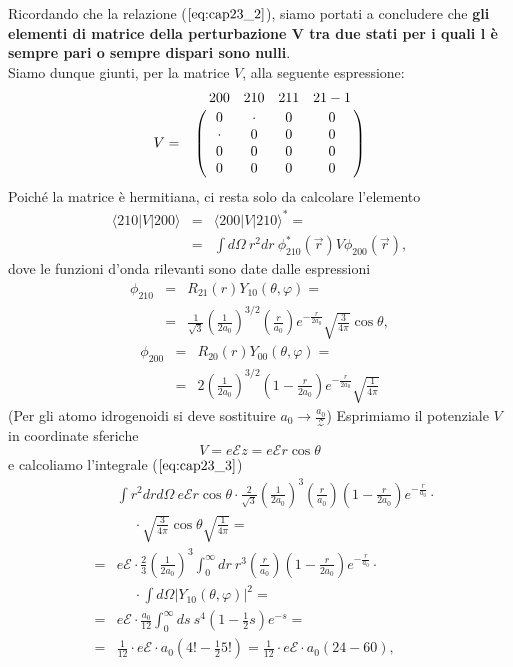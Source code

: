 Ricordando che la relazione ($\ref{eq:cap23_2}$), siamo portati a concludere che \textbf{gli elementi di matrice della perturbazione $\boldsymbol{V}$ tra due stati per i quali $\boldsymbol{l}$ è sempre pari o sempre dispari sono nulli}.\\
Siamo dunque giunti, per la matrice $V$, alla seguente espressione:
\begin{equation}  
V=
\bordermatrix{~&200&210&211&21-1\cr
& 0 & \cdot & 0 & 0 \cr
& \cdot & 0 & 0 & 0 \cr
& 0 & 0 & 0 & 0 \cr
& 0 & 0 & 0 & 0 \cr}
\end{equation}
Poiché la matrice è hermitiana, ci resta solo da calcolare l'elemento 
\begin{eqnarray} \label{eq:cap23_3}
\langle 210| V |200 \rangle & =&  \langle 200| V |210 \rangle^* = \nonumber \\
& = &\int d\Omega \ r^2 dr \ \phi_{210}^*(\vec{r}) V \phi_{200}(\vec{r}),
\end{eqnarray}
dove le funzioni d'onda rilevanti sono date dalle espressioni
\begin{eqnarray} 
\phi_{210}& = &R_{21}(r)Y_{10}(\theta, \varphi)= \nonumber  \\
& = & \frac{1}{\sqrt{3}}\left( \frac{1}{2a_0} \right)^{3/2} \left( \frac{r}{a_0} \right) e^{-\frac{r}{2a_0}} \sqrt{\frac{3}{4 \pi}} \cos \theta ,
\end{eqnarray}
\begin{eqnarray}
\phi_{200}& = & R_{20}(r)Y_{00}(\theta, \varphi)= \nonumber \\
& = & 2\left( \frac{1}{2a_0} \right)^{3/2} \left( 1-\frac{r}{2a_0} \right) e^{-\frac{r}{2a_0}} \sqrt{\frac{1}{4 \pi}} 
\end{eqnarray}
(Per gli atomo idrogenoidi si deve sostituire $a_0 \to \frac{a_0}{\mathcal{Z}}$)
Esprimiamo il potenziale $V$ in coordinate sferiche 
\begin{equation}
V=e \mathcal{E}z=e \mathcal{E} r \cos\theta
\end{equation}
e calcoliamo l'integrale ($\ref{eq:cap23_3}$) 
\begin{eqnarray}
 &  &\int r^2 dr d\Omega \   e \mathcal{E} r \cos\theta \cdot    \frac{2}{\sqrt{3}} \left( \frac{1}{2a_0} \right)^{3}   \left( \frac{r}{a_0} \right)     \left( 1-\frac{r}{2a_0} \right)  e^{-\frac{r}{a_0}} \cdot  \nonumber \\
 &  &\quad \  \cdot \sqrt{\frac{3}{4 \pi}} \cos \theta \sqrt{\frac{1}{4 \pi}}=  \nonumber \\ \nonumber
 & =& e \mathcal{E} \cdot \frac{2}{3}  \left( \frac{1}{2a_0} \right)^{3} \int_0^{\infty} dr \ r^3 \left( \frac{r}{a_0} \right)     \left( 1-\frac{r}{2a_0} \right)  e^{-\frac{r}{a_0}} \cdot \\ \nonumber
 & &\quad \ \cdot \int d\Omega \left| Y_{10}(\theta, \varphi) \right|^2=  \nonumber \\
 & =& e \mathcal{E} \cdot \frac{a_0}{12} \int_0^{\infty} ds \ s^4 \left(1-\frac{1}{2}s \right) e^{-s} = \nonumber \\
 & =& \frac{1}{12} \cdot e \mathcal{E} \cdot a_0 \left( 4!-\frac{1}{2}5! \right)= \frac{1}{12} \cdot  e \mathcal{E} \cdot a_0 (24-60),
\end{eqnarray}
